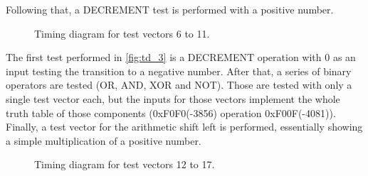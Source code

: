 \documentclass[10pt]{article}
\begin{document}
Following that, a DECREMENT test is performed with a positive number.
\begin{figure}[ht]
    \centering
    \caption{Timing diagram for test vectors 6 to 11.}
    \label{fig:td_2}
\end{figure}
\newpage
The first test performed in \autoref{fig:td_3} is a DECREMENT operation with 0 as an input testing the transition to a negative number. After that, a series of binary operators are tested (OR, AND, XOR and NOT).
Those are tested with only a single test vector each, but the inputs for those vectors implement the whole truth table of those components (0xF0F0(-3856) operation 0xF00F(-4081)).
Finally, a test vector for the arithmetic shift left is performed, essentially showing a simple multiplication of a positive number.
\begin{figure}[ht]
    \centering
    \caption{Timing diagram for test vectors 12 to 17.}
    \label{fig:td_3}
\end{figure}
\end{document}

